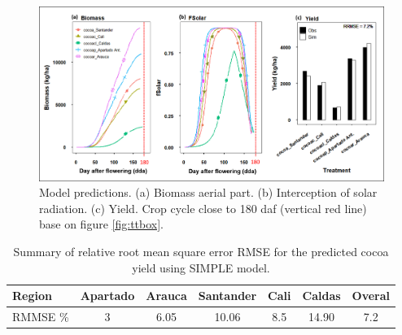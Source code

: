 \documentclass[gene,journal,article,submit,moreauthors,pdftex]{Definitions/mdpi}
\begin{document}
\begin{figure}[h!]
	\centering
	\includegraphics[scale=0.4]{images/outmodel.png}
	\caption{\footnotesize {Model predictions. (a) Biomass aerial part. (b) Interception of solar radiation. (c) Yield. Crop cycle close to 180 daf (vertical red line) base on figure  \ref{fig:ttbox}.  \\ }} 
	\label{fig:m1}
\end{figure}
 

\begin{table}[h!]	
	\caption {\footnotesize {Summary of relative root mean square error RMSE for the predicted cocoa yield using SIMPLE model.}}
	\label{tab:error} 
	\centering
	\begin{small}
		\begin{tabular}{l c c c c c c}
			\hline
			{\bf Region }&{\bf Apartado }&{\bf Arauca}&{\bf Santander}&{\bf Cali}&{\bf Caldas}&{\bf Overal}\\
			\hline
			RMMSE \%  & 3 & 6.05 & 10.06&8.5&14.90&7.2 \\
			\hline
		\end{tabular} \\
	\end{small}
\end{table}
\newpage
\end{document}
